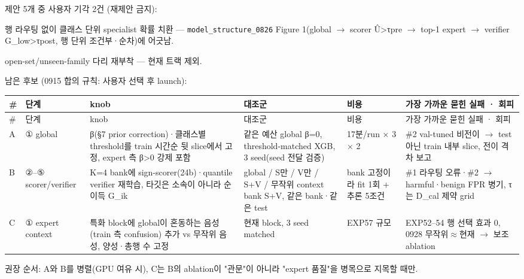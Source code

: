제안 5개 중 사용자 기각 2건 (재제안 금지):

\par\noindent \textbullet\enspace 행 라우팅 없이 클래스 단위 specialist 확률 치환 — \texttt{model\_\allowbreak{}\allowbreak{}st\allowbreak{}ructure\_\allowbreak{}\allowbreak{}0826} Figure 1(global  \ensuremath{\rightarrow}  scorer Û>τpre  \ensuremath{\rightarrow}  top-1 expert  \ensuremath{\rightarrow}  verifier G\_\allowbreak{}low>τpost, 행 단위 조건부·순차)에 어긋남.


\par\noindent \textbullet\enspace open-set/\allowbreak{}unseen-family 다리 재부착 — 현재 트랙 제외.


남은 후보 (0915 합의 규칙: 사용자 선택 후 launch):

\begingroup
\footnotesize
\begin{longtable}{>{\raggedright\arraybackslash}p{}>{\raggedright\arraybackslash}p{}>{\raggedright\arraybackslash}p{}>{\raggedright\arraybackslash}p{}>{\raggedright\arraybackslash}p{}>{\raggedright\arraybackslash}p{}}
\toprule
\# & 단계 & knob & 대조군 & 비용 & 가장 가까운 묻힌 실패 · 회피 \\ \midrule
\endfirsthead
\# & 단계 & knob & 대조군 & 비용 & 가장 가까운 묻힌 실패 · 회피 \\ \midrule
\endhead
{}A & ① global & β(§7 prior correction)·클래스별 threshold를 train 시간순 뒷 slice에서 고정, expert 측 β>0 강제 포함 & 같은 예산 global β=\allowbreak{}0, threshold-matched XGB, 3 seed(seed 전달 검증) & 17분/\allowbreak{}run × 3 × 2 & \#2 val-tuned 비전이  \ensuremath{\rightarrow}  test 아닌 train 내부 slice, 전이 격차 보고 \\
{}B & ②–⑤ scorer/\allowbreak{}verifier & K=\allowbreak{}4 bank에 sign-scorer(24b)·quantile verifier 재학습, 타깃은 소속이 아니라 순이득 G\_\allowbreak{}ik & global /\allowbreak{} S만 /\allowbreak{} V만 /\allowbreak{} S+\allowbreak{}V /\allowbreak{} 무작위 context bank S+\allowbreak{}V, 같은 bank·같은 test & bank 고정이라 fit 1회 +\allowbreak{} 추론 5조건 & \#1 라우팅 오류·\#2  \ensuremath{\rightarrow}  harmful·benign FPR 병기, τ는 D\_\allowbreak{}cal 제약 grid \\
{}C & ① expert context & 특화 block에 global이 혼동하는 음성(train 측 confusion) 추가 vs 무작위 음성, 양성·총행 수 고정 & 현재 block, 3 seed matched & EXP57 규모 & EXP52–54 행 선택 효과 0, 0928 무작위\ensuremath{\approx}현재  \ensuremath{\rightarrow}  보조 ablation \\
\bottomrule
\end{longtable}
\endgroup
권장 순서: A와 B를 병렬(GPU 여유 시), C는 B의 ablation이 "관문"이 아니라 "expert 품질"을 병목으로 지목할 때만.




